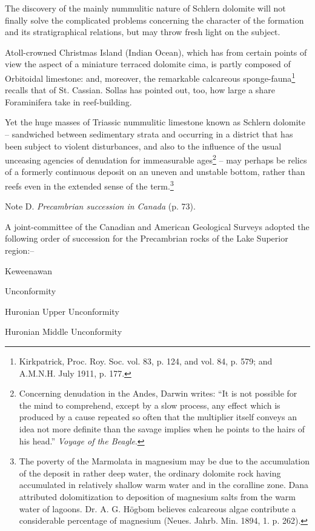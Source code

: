 \documentclass[a4paper, 12pt, oneside]{article}
\begin{document}
The discovery of the mainly nummulitic nature of Schlern dolomite will not finally solve the complicated problems concerning the character of the formation and its stratigraphical relations, but may throw fresh light on the subject.

Atoll-crowned Christmas Island (Indian Ocean), which has from certain points of view the aspect of a miniature terraced dolomite cima, is partly composed of Orbitoidal limestone: and, moreover, the remarkable calcareous sponge-fauna\footnote{Kirkpatrick, Proc. Roy. Soc. vol. 83, p. 124, and vol. 84, p. 579; and A.M.N.H. July 1911, p. 177.} recalls that of St. Cassian. Sollas has pointed out, too, how large a share Foraminifera take in reef-building.

Yet the huge masses of Triassic nummulitic limestone known as Schlern dolomite -- sandwiched between sedimentary strata and occurring in a district that has been subject to violent disturbances, and also to the influence of the usual unceasing agencies of denudation for immeasurable ages\footnote{Concerning denudation in the Andes, Darwin writes: ``It is not possible for the mind to comprehend, except by a slow process, any effect which is produced by a cause repeated so often that the multiplier itself conveys an idea not more definite than the savage implies when he points to the hairs of his head.'' \emph{Voyage of the Beagle}.} -- may perhaps be relics of a formerly continuous deposit on an uneven and unstable bottom, rather than reefs even in the extended sense of the term.\footnote{The poverty of the Marmolata in magnesium may be due to the accumulation of the deposit in rather deep water, the ordinary dolomite rock having accumulated in relatively shallow warm water and in the coralline zone. Dana attributed dolomitization to deposition of magnesium salts from the warm water of lagoons. Dr. A. G. Högbom believes calcareous algae contribute a considerable percentage of magnesium (Neues. Jahrb. Min. 1894, 1. p. 262).}

Note D. \emph{Precambrian succession in Canada} (p. 73).

A joint-committee of the Canadian and American Geological Surveys adopted the following order of succession for the Precambrian rocks of the Lake Superior region:--

Keweenawan

Unconformity

Huronian Upper Unconformity

Huronian Middle Unconformity
\end{document}
